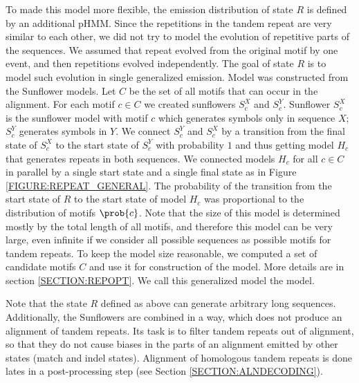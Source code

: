 To made this model more flexible, the emission distribution of state $R$ is
defined by an additional pHMM. Since the repetitions in the tandem repeat are
very similar to each other, we did not try to model the evolution of repetitive
parts of the sequences. We assumed that repeat evolved from the original motif
by one event, and then repetitions evolved independently. The goal of state $R$
is to model such evolution in single generalized emission. Model was
constructed from the Sunflower models. Let $C$ be the set of all motifs that
can occur in the alignment. For each motif $c\in C$ we created sunflowers
$S_c^X$ and $S_c^Y$.  Sunflower $S_c^X$ is the sunflower model with motif $c$
which generates symbols only in sequence $X$; $S_c^Y$ generates symbols in $Y$.
We connect $S_c^Y$ and $S_c^X$ by a transition from the final state of $S_c^X$
to the start state of $S_c^Y$ with probability $1$ and thus getting model $H_c$
that generates repeats in both sequences. We connected models $H_c$ for all
$c\in C$ in parallel by a single start state and a single final state as in
Figure \ref{FIGURE:REPEAT_GENERAL}. The probability of the transition from the
start state of $R$ to the start state of model $H_c$ was proportional to the
distribution of motifs $\prob{c}$. Note that the size of this model is
determined mostly by the total length of all motifs, and therefore this model
can be very large, even infinite if we consider all possible sequences as
possible motifs for tandem repeats.  To keep the model size reasonable, we
computed a set of candidate motifs $C$ and use it for construction of the
model. More details are in section \ref{SECTION:REPOPT}. We call this
generalized model the  model.

Note that the state $R$ defined as above can generate arbitrary long sequences.
Additionally, the Sunflowers are combined in a way, which does not produce an
alignment of tandem repeats.  Its task is to filter  tandem repeats out of
alignment, so that they do not cause biases in the parts of an alignment
emitted by other states (match and indel states). Alignment of homologous
tandem repeats is done lates in a post-processing step (see Section
\ref{SECTION:ALNDECODING}).

